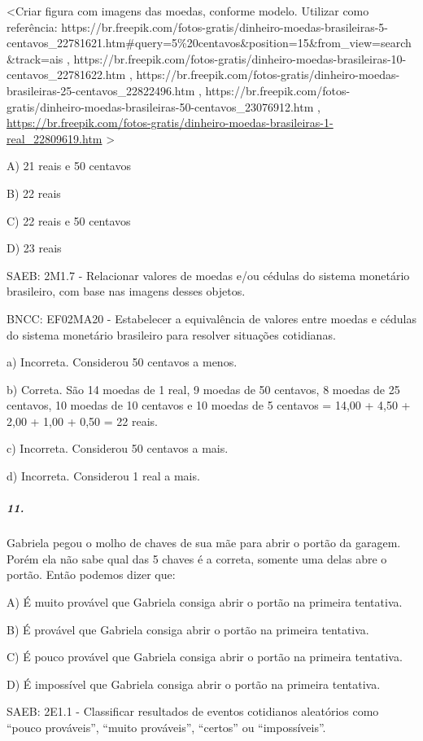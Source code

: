 \textless{}Criar figura com imagens das moedas, conforme modelo.
Utilizar como referência:
https://br.freepik.com/fotos-gratis/dinheiro-moedas-brasileiras-5-centavos\_22781621.htm\#query=5\%20centavos\&position=15\&from\_view=search\&track=ais
,
https://br.freepik.com/fotos-gratis/dinheiro-moedas-brasileiras-10-centavos\_22781622.htm
,
https://br.freepik.com/fotos-gratis/dinheiro-moedas-brasileiras-25-centavos\_22822496.htm
,
https://br.freepik.com/fotos-gratis/dinheiro-moedas-brasileiras-50-centavos\_23076912.htm
,
\url{https://br.freepik.com/fotos-gratis/dinheiro-moedas-brasileiras-1-real_22809619.htm}
\textgreater{}

A) 21 reais e 50 centavos

B) 22 reais

C) 22 reais e 50 centavos

D) 23 reais

SAEB: 2M1.7 - Relacionar valores de moedas e/ou cédulas do sistema
monetário brasileiro, com base nas imagens desses objetos.

BNCC: EF02MA20 - Estabelecer a equivalência de valores entre moedas e
cédulas do sistema monetário brasileiro para resolver situações
cotidianas.

a) Incorreta. Considerou 50 centavos a menos.

b) Correta. São 14 moedas de 1 real, 9 moedas de 50 centavos, 8 moedas
de 25 centavos, 10 moedas de 10 centavos e 10 moedas de 5 centavos =
14,00 + 4,50 + 2,00 + 1,00 + 0,50 = 22 reais.

c) Incorreta. Considerou 50 centavos a mais.

d) Incorreta. Considerou 1 real a mais.

\subparagraph{11.}\label{section-110}

Gabriela pegou o molho de chaves de sua mãe para abrir o portão da
garagem. Porém ela não sabe qual das 5 chaves é a correta, somente uma
delas abre o portão. Então podemos dizer que:

A) É muito provável que Gabriela consiga abrir o portão na primeira
tentativa.

B) É provável que Gabriela consiga abrir o portão na primeira tentativa.

C) É pouco provável que Gabriela consiga abrir o portão na primeira
tentativa.

D) É impossível que Gabriela consiga abrir o portão na primeira
tentativa.

SAEB: 2E1.1 - Classificar resultados de eventos cotidianos aleatórios
como ``pouco prováveis'', ``muito prováveis'', ``certos'' ou
``impossíveis''.

